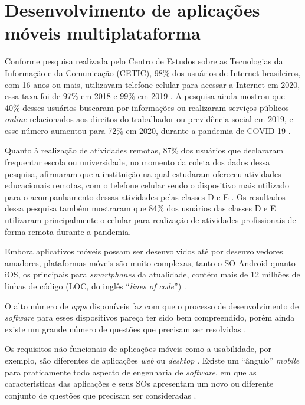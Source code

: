 \section{Desenvolvimento de aplicações móveis multiplataforma}

Conforme pesquisa realizada pelo Centro de Estudos sobre
as Tecnologias da Informação e da Comunicação (CETIC), 98\% dos usuários de Internet brasileiros, com 16 anos ou mais,
utilizavam telefone celular para acessar a Internet em 2020, essa taxa foi de 97\% em 2018 e 99\% em 2019 \cite{CETIC_2021}.
A pesquisa ainda mostrou que 40\% desses usuários buscaram por informações ou realizaram serviços públicos \emph{online} relacionados
aos direitos do trabalhador ou previdência social em 2019, e esse número aumentou para 72\% em
2020, durante a pandemia de COVID-19 \cite{CETIC_2021}.

Quanto à realização de atividades remotas, 87\% dos usuários que declararam frequentar escola ou universidade, no momento da coleta
dos dados dessa pesquisa, afirmaram que a instituição na qual estudaram ofereceu atividades educacionais remotas, com o telefone
celular sendo o dispositivo mais utilizado para o acompanhamento dessas atividades pelas classes D e E \cite{CETIC_2021}. Os resultados
dessa pesquisa também mostraram que 84\% dos usuários das classes D e E utilizaram principalmente o celular para realização de atividades
profissionais de forma remota durante a pandemia.

Embora aplicativos móveis possam ser desenvolvidos até por desenvolvedores amadores, plataformas móveis são muito complexas, tanto o
SO Android quanto iOS, os principais para \emph{smartphones} da atualidade, contém mais de 12 milhões de linhas de código
(LOC, do inglês ``\emph{lines of code}'') \cite{pressman2014software}.

O alto número de \emph{apps} disponíveis faz com que o processo de desenvolvimento de \emph{software} para esses dispositivos pareça
ter sido bem compreendido, porém ainda existe um grande número de questões que precisam ser resolvidas \cite{pressman2014software,Wasserman2010}.

Os requisitos não funcionais de aplicações móveis como a usabilidade, por exemplo, são diferentes de aplicações \emph{web} ou \emph{desktop} \cite{pressman2014software}. 
Existe um ``ângulo'' \emph{mobile} para praticamente todo aspecto de engenharia de \emph{software}, em que as caracteristicas
das aplicações e seus SOs apresentam um novo ou diferente conjunto de questões que precisam ser consideradas \cite{Wasserman2010}.

